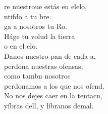\begin{cancion}%
	re nuestroue estás en elelo,\\
	ntifdo a tu bre.\\
	ga a nosotros tu Ro.\\
	Háge tu volud la tierra \\
	o en el elo.\\
	Danos  nuestro pan de cada a, \\
perdona nuestras ofensas, \\
	como tambn nosotros\\
	perdonamos a los que nos ofend.\\
	No nos dejes caer en la tentacn,\\
	yíbras dell, y líbranos demal.\\
{}\vspace*{-0.4cm}\\
	   \\
\end{cancion}%
